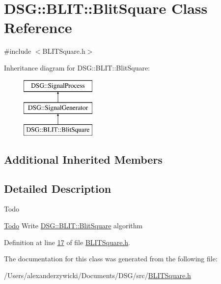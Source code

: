 \hypertarget{class_d_s_g_1_1_b_l_i_t_1_1_blit_square}{\section{D\+S\+G\+:\+:B\+L\+I\+T\+:\+:Blit\+Square Class Reference}
\label{class_d_s_g_1_1_b_l_i_t_1_1_blit_square}
}


{\ttfamily \#include $<$B\+L\+I\+T\+Square.\+h$>$}

Inheritance diagram for D\+S\+G\+:\+:B\+L\+I\+T\+:\+:Blit\+Square\+:\begin{figure}[H]
\begin{center}
\leavevmode
\includegraphics[height=3.000000cm]{class_d_s_g_1_1_b_l_i_t_1_1_blit_square}
\end{center}
\end{figure}
\subsection*{Additional Inherited Members}


\subsection{Detailed Description}
\begin{DoxyRefDesc}{Todo}
\item[\hyperlink{todo__todo000003}{Todo}]Write \hyperlink{class_d_s_g_1_1_b_l_i_t_1_1_blit_square}{D\+S\+G\+::\+B\+L\+I\+T\+::\+Blit\+Square} algorithm \end{DoxyRefDesc}


Definition at line \hyperlink{_b_l_i_t_square_8h_source_l00017}{17} of file \hyperlink{_b_l_i_t_square_8h_source}{B\+L\+I\+T\+Square.\+h}.



The documentation for this class was generated from the following file\+:\begin{DoxyCompactItemize}
\item 
/\+Users/alexanderzywicki/\+Documents/\+D\+S\+G/src/\hyperlink{_b_l_i_t_square_8h}{B\+L\+I\+T\+Square.\+h}\end{DoxyCompactItemize}
